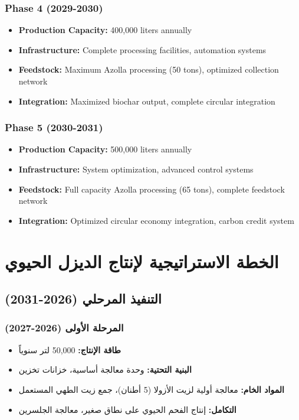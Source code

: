 \subsubsection{Phase 4 (2029-2030)}
\begin{itemize}
    \item \textbf{Production Capacity:} 400,000 liters annually
    \item \textbf{Infrastructure:} Complete processing facilities, automation systems
    \item \textbf{Feedstock:} Maximum Azolla processing (50 tons), optimized collection network
    \item \textbf{Integration:} Maximized biochar output, complete circular integration
\end{itemize}

\subsubsection{Phase 5 (2030-2031)}
\begin{itemize}
    \item \textbf{Production Capacity:} 500,000 liters annually
    \item \textbf{Infrastructure:} System optimization, advanced control systems
    \item \textbf{Feedstock:} Full capacity Azolla processing (65 tons), complete feedstock network
    \item \textbf{Integration:} Optimized circular economy integration, carbon credit system
\end{itemize}

\section{الخطة الاستراتيجية لإنتاج الديزل الحيوي}

\subsection{التنفيذ المرحلي (2026-2031)}

\subsubsection{المرحلة الأولى (2026-2027)}
\begin{itemize}
    \item \textbf{طاقة الإنتاج:} 50,000 لتر سنوياً
    \item \textbf{البنية التحتية:} وحدة معالجة أساسية، خزانات تخزين
    \item \textbf{المواد الخام:} معالجة أولية لزيت الأزولا (5 أطنان)، جمع زيت الطهي المستعمل
    \item \textbf{التكامل:} إنتاج الفحم الحيوي على نطاق صغير، معالجة الجلسرين
\end{itemize}

